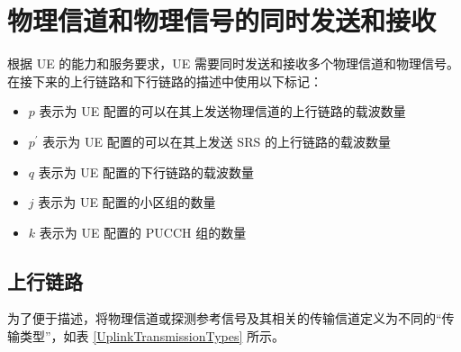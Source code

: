\documentclass[cn,hazy,blue,14pt,screen,device=normal]{elegantnote}
\begin{document}
\section{物理信道和物理信号的同时发送和接收}
根据 UE 的能力和服务要求，UE 需要同时发送和接收多个物理信道和物理信号。在接下来的上行链路和下行链路的描述中使用以下标记：
\begin{itemize}[leftmargin=2cm]
	\item $p$ 表示为 UE 配置的可以在其上发送物理信道的上行链路的载波数量
	\item $p^{'}$ 表示为 UE 配置的可以在其上发送 SRS 的上行链路的载波数量
	\item $q$ 表示为 UE 配置的下行链路的载波数量
	\item $j$ 表示为 UE 配置的小区组的数量
	\item $k$ 表示为 UE 配置的 PUCCH 组的数量
\end{itemize}

\subsection{上行链路}
为了便于描述，将物理信道或探测参考信号及其相关的传输信道定义为不同的“传输类型”，如表 \ref{UplinkTransmissionTypes} 所示。


\begin{table}[!htbp]
	\centering

	\caption{上行链路传输类型}
	\label{UplinkTransmissionTypes}
\end{table}
\end{document}
